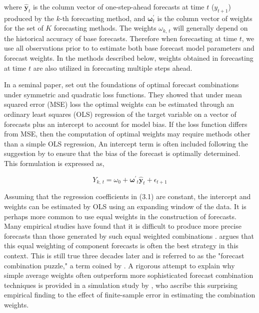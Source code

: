 \documentclass[
a4paper, %
12pt, %
]{CascadeAnalyticsWPS}
\begin{document}
where $\hat{\mathbf{{y}}}_{t}$ is the column vector of one-step-ahead forecasts at time $t$ ($y_{t +1}$) produced by the $k$-th forecasting method, and $\bm{\omega}^{\prime}_{t}$ is the column vector of weights for the set of $K$ forecasting methods. The weights $\omega_{k,\,t}$ will generally depend on the historical accuracy of base forecasts.
Therefore when forecasting at time $t$, we use all observations prior to to estimate both base forecast model parameters and forecast weights. In the methods described below, weights obtained in forecasting at time $t$ are also utilized in forecasting multiple steps ahead.

In a seminal paper, \cite{granger84} set out the foundations of optimal forecast combinations under symmetric and quadratic loss functions. They showed that under mean squared error (MSE) loss the optimal weights can be estimated through an ordinary least squares (OLS) regression of the target variable on a vector of forecasts plus an intercept to account for model bias. If the loss function differs from MSE, then the computation of optimal weights may require methods other than a simple OLS regression, An intercept term is often included following the suggestion by \cite{granger84} to ensure that the bias of the forecast is optimally determined. This formulation is expressed as,

\begin{equation}
	Y_{k, \, t} = \omega_{0} + \bm{\omega^{\prime}}_{t}\hat{\mathbf{{y}}}_{t} + \epsilon_{t+1}
\end{equation}

Assuming that the regression coefficients in (3.1) are constant, the intercept and weights can be estimated by OLS using an expanding window of the data. It is perhaps more common to use equal weights in the construction of forecasts. Many empirical studies have found that it is difficult to produce more precise forecasts than those generated by such equal weighted combinations \citep{gaglianone2014}. \cite{clemen89} argues that this equal weighting of component forecasts is often the best strategy in this context. This is still true three decades later and is referred to as the "forecast combination puzzle," a term coined by \cite{stock_combination_2004}. A rigorous attempt to explain why simple average weights often outperform more sophisticated forecast combination techniques is provided in a simulation study by \cite{smith2009}, who ascribe this surprising empirical
finding to the effect of finite-sample error in estimating the combination weights.
\end{document}
